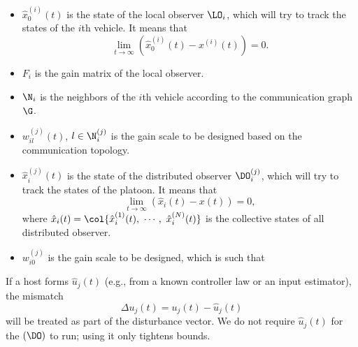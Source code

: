 \begin{itemize}
    \item $\hat{x}_{0}^{(i)}(t)$ is the state of the local observer $\LO_{i}$, which will try to track the states of the $i$th vehicle. It means that
    \begin{equation}
        \lim_{t \rightarrow \infty} \left( \hat{x}_{0}^{(i)}(t) - x^{(i)}(t) \right)= 0. 
        \label{eq_hatx_0}
    \end{equation}
    \item $F_{i}$ is the gain matrix of the local observer. 
    \item ${\N}_{i}$ is the neighbors of the $i$th vehicle according to the communication graph $\G$.%
    \item {$w_{i l}^{(j)}(t)$, $l \in \N_{i}^{(j)}$ is the gain scale to be designed based on the communication topology.}
    \item $\hat{x}^{(j)}_i(t)$ is the state of the distributed observer $\DO_{i}^{(j)}$, which will try to track the states of the platoon. It means that 
    \begin{equation}
        \lim_{t \rightarrow \infty} \left( \hat{x}_i(t) - x(t) \right)= 0,
        \label{eq_hatx_i}
    \end{equation}
    where $\hat{x}_i(t) = \col{\hat{x}^{(1)}_i(t) , \ \cdots , \ \hat{x}^{(N)}_i(t) }$ is the collective states of all distributed observer.
    \item $w_{i 0}^{(j)}$ is the gain scale to be designed, which is such that
\end{itemize}




\begin{remark}\label{rem1}
If a host forms $\hat{u}_j(t)$ (e.g., from a known controller law or an input estimator), the mismatch 
\begin{equation}
    \Delta u_j(t) = u_j(t) - \hat{u}_j(t)
\end{equation}
will be treated as part of the disturbance vector. %
We do not require $\hat{u}_j(t)$ for the $(\DO)$ to run; using it only tightens bounds.
\end{remark}




